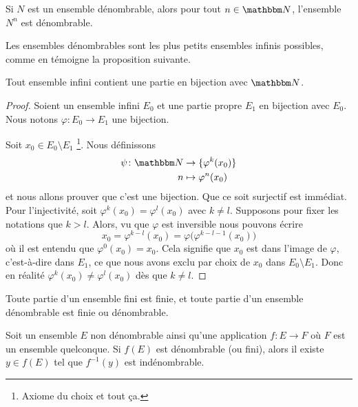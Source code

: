 \begin{proposition}     \label{PROPooDMZHooXouDrQ}
    Si \( N\) est un ensemble dénombrable, alors pour tout \( n\in \eN\), l'ensemble \( N^n\) est dénombrable.
\end{proposition}

Les ensembles dénombrables sont les plus petits ensembles infinis possibles, comme en témoigne la proposition suivante.
\begin{proposition}      \label{PROPooUIPAooCUEFme}
    Tout ensemble infini contient une partie en bijection avec \( \eN\).
\end{proposition}

\begin{proof}
    Soient un ensemble infini \( E_0\) et une partie propre \( E_1\) en bijection avec \( E_0\). Nous notons \( \varphi\colon E_0\to E_1\) une bijection.

    Soit \( x_0\in E_0\setminus E_1\) \footnote{Axiome du choix et tout ça.}. Nous définissons
    \begin{equation}
        \begin{aligned}
            \psi\colon \eN&\to \{\varphi^k(x_0)\} \\
            n&\mapsto \varphi^n(x_0)
        \end{aligned}
    \end{equation}
    et nous allons prouver que c'est une bijection. Que ce soit surjectif est immédiat. Pour l'injectivité, soit \( \varphi^k(x_0)=\varphi^l(x_0)\) avec \( k\neq l\). Supposons pour fixer les notations que \( k>l\). Alors, vu que \( \varphi\) est inversible nous pouvons écrire
    \begin{equation}
        x_0=\varphi^{k-l}(x_0)=\varphi\big( \varphi^{k-l-1}(x_0) \big)
    \end{equation}
    où il est entendu que \( \varphi^0(x_0)=x_0\). Cela signifie que \( x_0\) est dans l'image de \( \varphi\), c'est-à-dire dans $E_1$, ce que nous avons exclu par choix de \( x_0\) dans \( E_0\setminus E_1\). Donc en réalité \( \varphi^k(x_0)\neq \varphi^l(x_0)\) dès que \( k\neq l\).
\end{proof}

\begin{proposition} \label{PropQEPoozLqOQ}
    Toute partie d'un ensemble fini est finie, et toute partie d'un ensemble dénombrable est finie ou dénombrable.
\end{proposition}

\begin{lemma}   \label{LEMooGTOTooFbpvzU}
    Soit un ensemble \( E\) non dénombrable ainsi qu'une application \( f\colon E\to F\) où \( F\) est un ensemble quelconque. Si \( f(E)\) est dénombrable (ou fini), alors il existe \( y\in f(E)\) tel que \( f^{-1}(y)\) est indénombrable.
\end{lemma}

